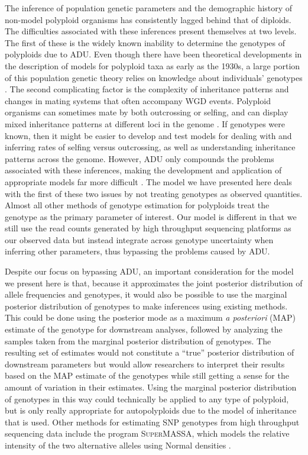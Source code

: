 \documentclass[11pt,english,letterpaper,oneside]{article}
\begin{document}
The inference of population genetic parameters and the demographic history of non-model polyploid organisms has consistently lagged behind that of diploids. The difficulties associated with these inferences present themselves at two levels. The first of these is the widely known inability to determine the genotypes of polyploids due to ADU. Even though there have been theoretical developments in the description of models for polyploid taxa as early as the 1930s, a large portion of this population genetic theory relies on knowledge about individuals' genotypes \citep[e.g.,][]{haldane1930autopolyploids,wright1938polyploid}. The second complicating factor is the complexity of inheritance patterns and changes in mating systems that often accompany WGD events. Polyploid organisms can sometimes mate by both outcrossing or selfing, and can display mixed inheritance patterns at different loci in the genome \citep{dufresne2014polyPopGen}. If genotypes were known, then it might be easier to develop and test models for dealing with and inferring rates of selfing versus outcrossing, as well as understanding inheritance patterns across the genome. However, ADU only compounds the problems associated with these inferences, making the development and application of appropriate models far more difficult \citep[but see list of software in][]{dufresne2014polyPopGen}. The model we have presented here deals with the first of these two issues by not treating genotypes as observed quantities. Almost all other methods of genotype estimation for polyploids treat the genotype as the primary parameter of interest. Our model is different in that we still use the read counts generated by high throughput sequencing platforms as our observed data but instead integrate across genotype uncertainty when inferring other parameters, thus bypassing the problems caused by ADU.
\medskip

Despite our focus on bypassing ADU, an important consideration for the model we present here is that, because it approximates the joint posterior distribution of allele frequencies and genotypes, it would also be possible to use the marginal posterior distribution of genotypes to make inferences using existing methods. This could be done using the posterior mode as a maximum \textit{a posteriori} (MAP) estimate of the genotype for downstream analyses, followed by analyzing the samples taken from the marginal posterior distribution of genotypes. The resulting set of estimates would not constitute a ``true'' posterior distribution of downstream parameters but would allow researchers to interpret their results based on the MAP estimate of the genotypes while still getting a sense for the amount of variation in their estimates. Using the marginal posterior distribution of genotypes in this way could technically be applied to any type of polyploid, but is only really appropriate for autopolyploids due to the model of inheritance that is used. Other methods for estimating SNP genotypes from high throughput sequencing data include the program \textsc{SuperMASSA}, which models the relative intensity of the two alternative alleles using Normal densities \citep{serang2012supermassa}. 
\medskip
\end{document}
